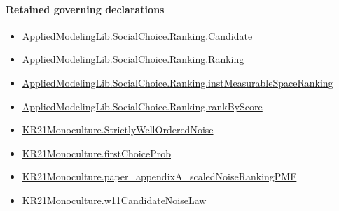 \documentclass[10pt]{article}
\begin{document}
\paragraph{Retained governing declarations}
\begin{itemize}\raggedright
\item \hyperlink{library-prerequisite-8c0e6c25845ae78a}{Applied\allowbreak{}Modeling\allowbreak{}Lib.\allowbreak{}Social\allowbreak{}Choice.\allowbreak{}Ranking.\allowbreak{}Candidate}
\item \hyperlink{library-prerequisite-5cde54446d1ae021}{Applied\allowbreak{}Modeling\allowbreak{}Lib.\allowbreak{}Social\allowbreak{}Choice.\allowbreak{}Ranking.\allowbreak{}Ranking}
\item \hyperlink{governing-declaration-30ca9c740ef703ec}{Applied\allowbreak{}Modeling\allowbreak{}Lib.\allowbreak{}Social\allowbreak{}Choice.\allowbreak{}Ranking.\allowbreak{}inst\allowbreak{}Measurable\allowbreak{}Space\allowbreak{}Ranking}
\item \hyperlink{governing-declaration-c2e98278351275b0}{Applied\allowbreak{}Modeling\allowbreak{}Lib.\allowbreak{}Social\allowbreak{}Choice.\allowbreak{}Ranking.\allowbreak{}rank\allowbreak{}By\allowbreak{}Score}
\item \hyperlink{governing-declaration-d544d2ea8cae0d2a}{KR21\allowbreak{}Monoculture.\allowbreak{}Strictly\allowbreak{}Well\allowbreak{}Ordered\allowbreak{}Noise}
\item \hyperlink{governing-declaration-93eb0433da315974}{KR21\allowbreak{}Monoculture.\allowbreak{}first\allowbreak{}Choice\allowbreak{}Prob}
\item \hyperlink{governing-declaration-8ae267e23d0028a9}{KR21\allowbreak{}Monoculture.\allowbreak{}paper\_\allowbreak{}appendix\allowbreak{}A\_\allowbreak{}scaled\allowbreak{}Noise\allowbreak{}Ranking\allowbreak{}PMF}
\item \hyperlink{governing-declaration-c03b4b3d907f0eef}{KR21\allowbreak{}Monoculture.\allowbreak{}w11\allowbreak{}Candidate\allowbreak{}Noise\allowbreak{}Law}
\end{itemize}
\end{document}
